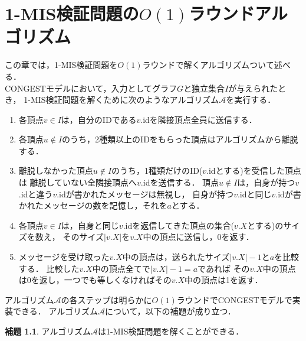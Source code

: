 \documentclass[12pt]{thesis}
\newcommand{\CONGEST}{\textsf{CONGEST}}
\theoremstyle{definition}
\newtheorem{lemma}{補題}[chapter]
\begin{document}
\chapter{1-MIS検証問題の$O(1)$ラウンドアルゴリズム}
この章では，1-MIS検証問題を$O(1)$ラウンドで解くアルゴリズムついて述べる． \\
{\CONGEST}モデルにおいて，入力としてグラフ$G$と独立集合$I$が与えられたとき，
1-MIS検証問題を解くために次のようなアルゴリズム$\mathcal{A}$を実行する．
\begin{enumerate}
\item 各頂点$v \in I$は，自分のIDである$v$.idを隣接頂点全員に送信する．
\item 各頂点$u \notin I$のうち，2種類以上のIDをもらった頂点はアルゴリズムから離脱する．
\item 離脱しなかった頂点$u \notin I$のうち，1種類だけのID($v$.idとする)を受信した頂点は
離脱していない全隣接頂点へ$v$.idを送信する．
頂点$u \notin I$は，自身が持つ$v$.idと違う$v$.idが書かれたメッセージは無視し，
自身が持つ$v$.idと同じ$v$.idが書かれたメッセージの数を記憶し，それを$a$とする．
\item 各頂点$v \in I$は，自身と同じ$v$.idを返信してきた頂点の集合($v.X$とする)のサイズを数え，
そのサイズ$|v.X|$を$v.X$中の頂点に送信し，0を返す．
\item メッセージを受け取った$v.X$中の頂点は，送られたサイズ$|v.X| - 1$と$a$を比較する．
比較した$v.X$中の頂点全てで$|v.X| - 1 = a$であれば
その$v.X$中の頂点は0を返し，一つでも等しくなければその$v.X$中の頂点は1を返す．
\end{enumerate}
アルゴリズム$\mathcal{A}$の各ステップは明らかに$O(1)$ラウンドで{\CONGEST}モデルで実装できる．
アルゴリズム$\mathcal{A}$について，以下の補題が成り立つ．
\begin{lemma}
アルゴリズム$\mathcal{A}$は1-MIS検証問題を解くことができる．
\end{lemma}
\end{document}
